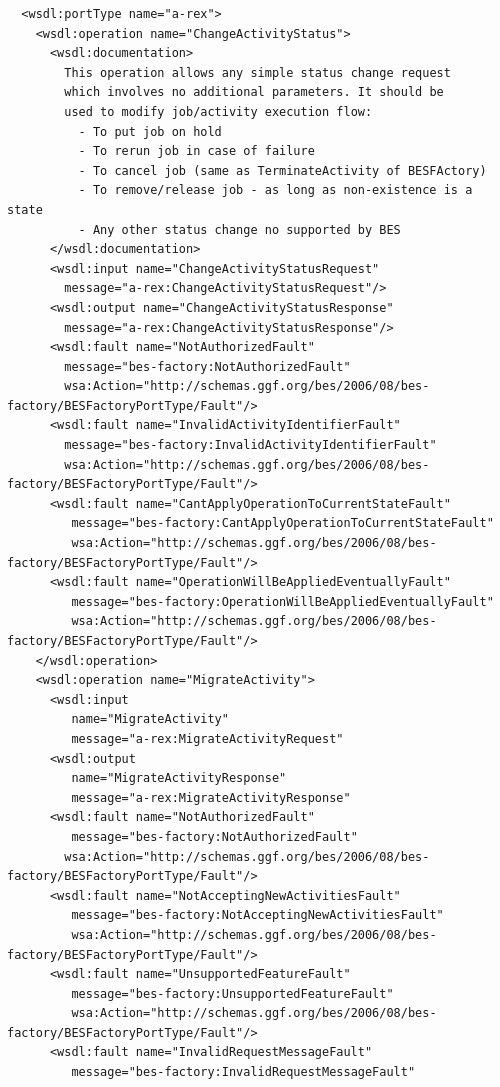 \documentclass{article}                            %
\begin{document}
\begin{footnotesize}
\begin{verbatim}
  <wsdl:portType name="a-rex">
    <wsdl:operation name="ChangeActivityStatus">
      <wsdl:documentation>
        This operation allows any simple status change request
        which involves no additional parameters. It should be
        used to modify job/activity execution flow:
          - To put job on hold
          - To rerun job in case of failure
          - To cancel job (same as TerminateActivity of BESFActory)
          - To remove/release job - as long as non-existence is a state
          - Any other status change no supported by BES
      </wsdl:documentation>
      <wsdl:input name="ChangeActivityStatusRequest"
        message="a-rex:ChangeActivityStatusRequest"/>
      <wsdl:output name="ChangeActivityStatusResponse"
        message="a-rex:ChangeActivityStatusResponse"/>
      <wsdl:fault name="NotAuthorizedFault"
        message="bes-factory:NotAuthorizedFault"
        wsa:Action="http://schemas.ggf.org/bes/2006/08/bes-factory/BESFactoryPortType/Fault"/>
      <wsdl:fault name="InvalidActivityIdentifierFault"
        message="bes-factory:InvalidActivityIdentifierFault"
        wsa:Action="http://schemas.ggf.org/bes/2006/08/bes-factory/BESFactoryPortType/Fault"/>
      <wsdl:fault name="CantApplyOperationToCurrentStateFault"
         message="bes-factory:CantApplyOperationToCurrentStateFault"
         wsa:Action="http://schemas.ggf.org/bes/2006/08/bes-factory/BESFactoryPortType/Fault"/>
      <wsdl:fault name="OperationWillBeAppliedEventuallyFault"
         message="bes-factory:OperationWillBeAppliedEventuallyFault"
         wsa:Action="http://schemas.ggf.org/bes/2006/08/bes-factory/BESFactoryPortType/Fault"/>
    </wsdl:operation>
    <wsdl:operation name="MigrateActivity">
      <wsdl:input 
         name="MigrateActivity"
         message="a-rex:MigrateActivityRequest"  
      <wsdl:output
         name="MigrateActivityResponse"
         message="a-rex:MigrateActivityResponse"
      <wsdl:fault name="NotAuthorizedFault" 
         message="bes-factory:NotAuthorizedFault"
        wsa:Action="http://schemas.ggf.org/bes/2006/08/bes-factory/BESFactoryPortType/Fault"/>
      <wsdl:fault name="NotAcceptingNewActivitiesFault" 
         message="bes-factory:NotAcceptingNewActivitiesFault"
         wsa:Action="http://schemas.ggf.org/bes/2006/08/bes-factory/BESFactoryPortType/Fault"/>
      <wsdl:fault name="UnsupportedFeatureFault" 
         message="bes-factory:UnsupportedFeatureFault"
         wsa:Action="http://schemas.ggf.org/bes/2006/08/bes-factory/BESFactoryPortType/Fault"/>
      <wsdl:fault name="InvalidRequestMessageFault"
         message="bes-factory:InvalidRequestMessageFault"

\end{verbatim}
\end{footnotesize}
\end{document}

